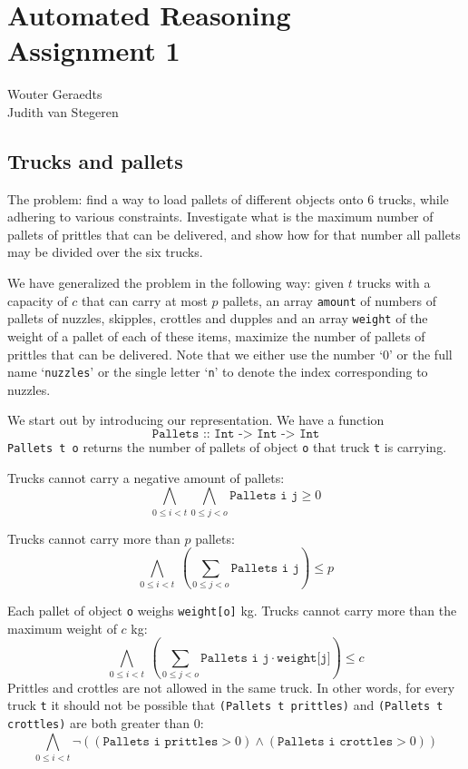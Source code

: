 \documentclass[12pt]{article}
\begin{document}
\section*{Automated Reasoning\\Assignment 1}

\begin{center}
Wouter Geraedts \\
Judith van Stegeren\\
\end{center}

\vspace{8mm}

\subsection*{Trucks and pallets}
The problem: find a way to load pallets of different objects onto 6 trucks, while adhering to various constraints. Investigate what is the maximum number of pallets of prittles that can be delivered, and show how for that number all pallets may be divided over the six trucks.

We have generalized the problem in the following way: given $t$ trucks with a capacity of $c$ that can carry at most $p$ pallets, an array \texttt{amount} of numbers of pallets of nuzzles, skipples, crottles and dupples and an array \texttt{weight} of the weight of a pallet of each of these items, maximize the number of pallets of prittles that can be delivered.
Note that we either use the number `$0$' or the full name `\texttt{nuzzles}' or the single letter `\texttt{n}' to denote the index corresponding to nuzzles.

We start out by introducing our representation. We have a function 
\[\texttt{Pallets :: Int -> Int -> Int}\]
\texttt{Pallets t o} returns the number of pallets of object \texttt{o} that truck \texttt{t} is carrying.

Trucks cannot carry a negative amount of pallets:
\[ \bigwedge_{0 \le i < t} \bigwedge_{0 \le j < o} \texttt{Pallets i j} \ge 0 \]

Trucks cannot carry more than $p$ pallets:
\[ \bigwedge_{0 \le i < t} ~ ( \sum_{0 \le j < o} \texttt{Pallets i j} ) \le p \]

Each pallet of object \texttt{o} weighs \texttt{weight[o]} kg. Trucks cannot carry more than the maximum weight of $c$ kg:
\[ \bigwedge_{0 \le i < t} ~ (\sum_{0 \le j < o} \texttt{Pallets i j} \cdot \texttt{weight[j]}) \le c \]
Prittles and crottles are not allowed in the same truck. In other words, for every truck \texttt{t} it should not be possible that \texttt{(Pallets t prittles)} and \texttt{(Pallets t crottles)} are both greater than 0:
\[ \bigwedge_{0 \le i < t} \neg \left(( \texttt{Pallets i prittles} > 0) \wedge (\texttt{Pallets i crottles} > 0 )\right)\]
\end{document}
